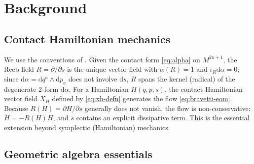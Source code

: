 \documentclass[11pt]{article}
\newcommand{\dif}{\mathrm{d}}
\begin{document}
\section{Background}

\subsection{Contact Hamiltonian mechanics}
\label{sec:background-contact}

We use the conventions of \cite{bravetti2017contact}. Given the contact form \eqref{eq:alpha} on $M^{2n+1}$, the Reeb field $R = \partial/\partial s$ is the unique vector field with $\alpha(R)=1$ and $\iota_R\dif\alpha = 0$; since $\dif\alpha = \dif q^a\wedge\dif p_a$ does not involve $\dif s$, $R$ spans the kernel (radical) of the degenerate $2$-form $\dif\alpha$. For a Hamiltonian $H(q,p,s)$, the contact Hamiltonian vector field $X_H$ defined by \eqref{eq:xh-defn} generates the flow \eqref{eq:bravetti-eom}. Because $R(H) = \partial H/\partial s$ generally does not vanish, the flow is non-conservative: $\dot H = -R(H)H$, and $\dot s$ contains an explicit dissipative term. This is the essential extension beyond symplectic (Hamiltonian) mechanics.

\subsection{Geometric algebra essentials}
\label{sec:background-ga}
\end{document}
